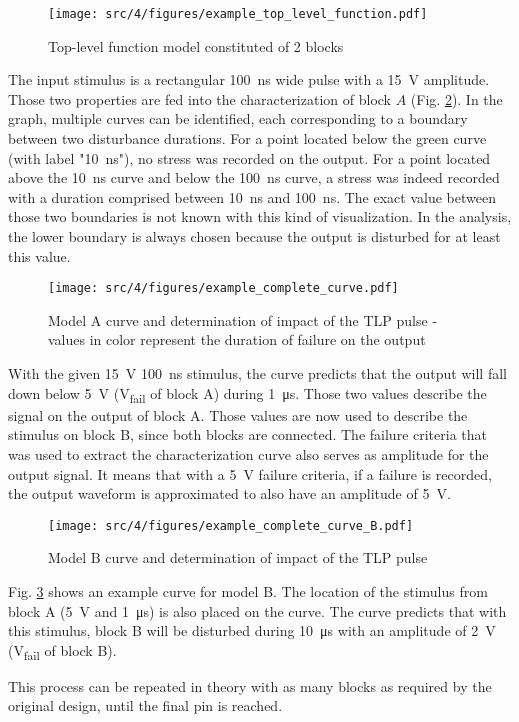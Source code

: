 \begin{figure}[!h]
  \centering
  \texttt{[image: src/4/figures/example\_top\_level\_function.pdf]}
  \caption{Top-level function model constituted of 2 blocks}
  \label{example_toplevel_function}
\end{figure}

The input stimulus is a rectangular \SI{100}{\nano\second} wide pulse with a \SI{15}{\volt} amplitude.
Those two properties are fed into the characterization of block $A$ (Fig. \ref{example_complete_curve}).
In the graph, multiple curves can be identified, each corresponding to a boundary between two disturbance durations.
For a point located below the green curve (with label "\SI{10}{\nano\second}"), no stress was recorded on the output.
For a point located above the \SI{10}{\nano\second} curve and below the \SI{100}{\nano\second} curve, a stress was indeed recorded with a duration comprised between \SI{10}{\nano\second} and \SI{100}{\nano\second}.
The exact value between those two boundaries is not known with this kind of visualization.
In the analysis, the lower boundary is always chosen because the output is disturbed for at least this value.

\begin{figure}[!h]
  \centering
  \texttt{[image: src/4/figures/example\_complete\_curve.pdf]}
  \caption{Model A curve and determination of impact of the TLP pulse - values in color represent the duration of failure on the output}
  \label{example_complete_curve}
\end{figure}

With the given \SI{15}{\volt} \SI{100}{\nano\second} stimulus, the curve predicts that the output will fall down below \SI{5}{\volt} (V\textsubscript{fail} of block A) during \SI{1}{\micro\second}.
Those two values describe the signal on the output of block A.
Those values are now used to describe the stimulus on block B, since both blocks are connected.
The failure criteria that was used to extract the characterization curve also serves as amplitude for the output signal.
It means that with a \SI{5}{\volt} failure criteria, if a failure is recorded, the output waveform is approximated to also have an amplitude of \SI{5}{\volt}.

\begin{figure}[!h]
  \centering
  \texttt{[image: src/4/figures/example\_complete\_curve\_B.pdf]}
  \caption{Model B curve and determination of impact of the TLP pulse}
  \label{example_complete_curve_B}
\end{figure}

Fig. \ref{example_complete_curve_B} shows an example curve for model B.
The location of the stimulus from block A (\SI{5}{\volt} and \SI{1}{\micro\second}) is also placed on the curve.
The curve predicts that with this stimulus, block B will be disturbed during \SI{10}{\micro\second} with an amplitude of \SI{2}{\volt} (V\textsubscript{fail} of block B).


This process can be repeated in theory with as many blocks as required by the original design, until the final pin is reached.
